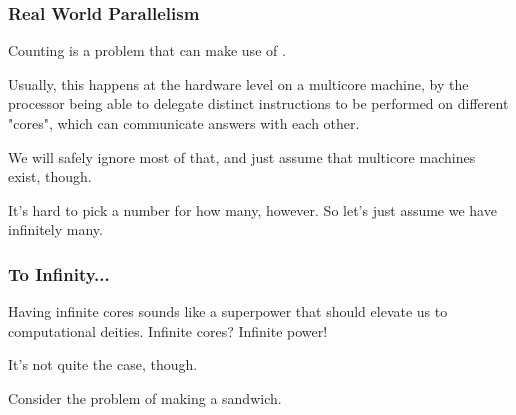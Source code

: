 \documentclass[aspectratio=169, handout]{beamer}
\begin{document}
\begin{frame}[fragile]
  \frametitle{Real World Parallelism}

  Counting is a problem that can make use of .

  \pause
  \vspace{\fill}


  \pause
  \vspace{\fill}

  Usually, this happens at the hardware level on a multicore machine, by the processor being
  able to delegate distinct instructions to be performed on different "cores", which can
  communicate answers with each other.

  \pause
  \vspace{\fill}

  We will safely ignore most of that, and just assume that multicore machines exist, though.

  \pause
  \vspace{\fill}

  It's hard to pick a number for how many, however. So let's just assume we have infinitely many.
\end{frame}

\begin{frame}[fragile]
  \frametitle{To Infinity...}

  Having infinite cores sounds like a superpower that should elevate us to computational deities.
  Infinite cores? Infinite power!

  \pause
  \vspace{\fill}

  It's not quite the case, though.

  \pause
  \vspace{\fill}

  Consider the problem of making a sandwich.
\end{frame}
\end{document}
